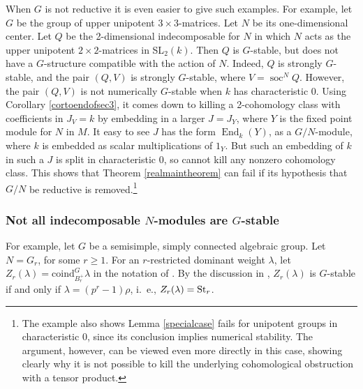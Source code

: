 \documentclass[11pt,leqno,amscd,amssymb,verbatim, url]{amsart}
\theoremstyle{definition}
\numberwithin{equation}{thm}
\newcommand{\St}{\text{\rm St}}
\newcommand{\End}{\operatorname{End}}
\newcommand{\soc}{\operatorname{soc}}
\begin{document}
When $G$ is not reductive it is even easier to give such examples. For example, let $G$ be the group of upper unipotent
$3\times 3$-matrices. Let $N$ be its one-dimensional center. Let $Q$ be the 2-dimensional indecomposable for $N$ in which
$N$ acts as the upper unipotent $2\times 2$-matrices in SL$_2(k)$.  Then $Q$ is $G$-stable, but does not have a $G$-structure compatible with the action of $N$. Indeed, $Q$ is strongly $G$-stable, and the pair $(Q,V)$ is strongly $G$-stable, where $V=\soc^N Q$. However, the pair $(Q,V)$ is not numerically $G$-stable when $k$ has characteristic 0. Using Corollary \ref{cortoendofsec3},
 it comes down to killing a 2-cohomology class with coefficients in $J_V = k$ by embedding in a larger $J=J_Y$, where $Y$ is the fixed point module for $N$ in $M$. It easy to see $J$ has the form $\End_k(Y)$, as a $G/N$-module, where $k$ is embedded as scalar
 multiplications of $1_Y$. But such an embedding of $k$ in such a $J$ is split in characteristic 0, so cannot kill any
nonzero cohomology class.
This shows that Theorem \ref{realmaintheorem} can fail if its
hypothesis that $G/N$ be reductive is removed.\footnote{The example also shows Lemma \ref{specialcase} fails for unipotent groups
  in characteristic 0, since its conclusion implies numerical
  stability. The argument, however, can be viewed even more
  directly in this case, showing clearly why it is not possible
  to kill the underlying cohomological obstruction with a tensor product.}

\subsubsection{Not all indecomposable $N$-modules are $G$-stable} For example, let $G$ be a semisimple, simply connected algebraic
group.
Let $N=G_r$, for some $r\geq 1$. For an $r$-restricted dominant weight $\lambda$, let $Z_r(\lambda)=\text{coind}_{B_r^+}^G\lambda$
in the notation of \cite[II.3]{Jan}. By the discussion in \cite[II.11]{Jan}, $Z_r(\lambda)$ is $G$-stable if and only
if $\lambda=(p^r-1)\rho$, i.~e., $Z_r(\lambda)=\St_r$.
\end{document}
